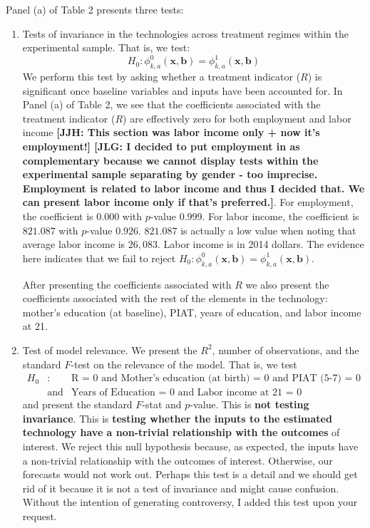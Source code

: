\noindent Panel (a) of Table 2 presents three tests: 
\begin{enumerate}
\item Tests of invariance in the technologies across treatment regimes within the experimental sample. That is, we test:
	\begin{equation} 
	H_0: \phi_{k,a}^0 \left( \bm{x}, \bm{b} \right) = \phi_{k,a}^1 \left( \bm{x}, \bm{b} \right)  
	\end{equation}
\noindent We perform this test by asking whether a treatment indicator ($R$) is significant once baseline variables and inputs have been accounted for.  In Panel (a) of Table 2, we see that the coefficients associated with the treatment indicator ($R$) are effectively zero for both employment and labor income \textbf{[JJH: This section was labor income only + now it's employment!] [JLG: I decided to put employment in as complementary because we cannot display tests within the experimental sample separating by gender - too imprecise. Employment is related to labor income and thus I decided that. We can present labor income only if that's preferred.]}. For employment, the coefficient is $0.000$ with $p$-value $0.999$. For labor income, the coefficient is $821.087$ with $p$-value $0.926$. $821.087$ is actually a low value when noting that average labor income is $26,083$. Labor income is in 2014 dollars. The evidence here indicates that we fail to reject $H_0: \phi_{k,a}^0 \left( \bm{x}, \bm{b} \right) = \phi_{k,a}^1 \left( \bm{x}, \bm{b} \right)$. 

\noindent After presenting the coefficients associated with $R$ we also present the coefficients associated with the rest of the elements in the technology: mother's education (at baseline), PIAT, years of education, and labor income at 21.\\

\item Test of model relevance. We present the $R^2$, number of observations, and the standard $F$-test on the relevance of the model. That is, we test 
	\begin{eqnarray} 
	H_0&:& \text{R = 0 and Mother's education (at birth) = 0 and PIAT (5-7) = 0} \nonumber \\ 
	      & \text{and} & \text{Years of Education = 0 and Labor income at 21 = 0}
	\end{eqnarray}
\noindent and present the standard $F$-stat and $p$-value. This is \textbf{not testing invariance}. This is \textbf{testing whether the inputs to the estimated technology have a non-trivial relationship with the outcomes} of interest. We reject this null hypothesis because, as expected, the inputs have a non-trivial relationship with the outcomes of interest. Otherwise, our forecasts would not work out. Perhaps this test is a detail and we should get rid of it because it is not a test of invariance and might cause confusion. Without the intention of generating controversy, I added this test upon your request.\\


\end{enumerate}
